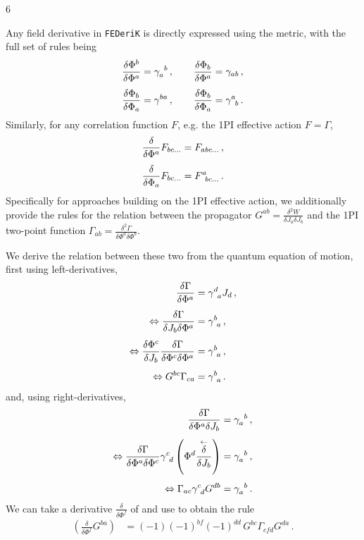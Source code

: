 6\documentclass[10pt,prd,nofootinbib,superscriptaddress,twocolumn]{revtex4-2}
\newcommand{\FEDeriK}{\texttt{FEDeriK}\xspace}
\begin{document}
Any field derivative in \FEDeriK is directly expressed using the metric, with the full set of rules being
%
\begin{align}
	\frac{\delta \Phi^b}{\delta \Phi^a} &= \gamma_a^{\phantom{a}b}
	\,,\qquad
	\frac{\delta \Phi_b}{\delta \Phi^a} = \gamma_{ab}
	\,,\notag\\[1ex]
	\frac{\delta \Phi_b}{\delta \Phi_a} &= \gamma^{ba}
	\,,\qquad
	\frac{\delta \Phi_b}{\delta \Phi_a} = \gamma^{a}_{\phantom{a}b}
	\,.
\end{align}
%
Similarly, for any correlation function $F$, e.g. the 1PI effective action $F=\Gamma$, 
%
\begin{align}
	\frac{\delta }{\delta \Phi^a} F_{bc\ldots} = F_{abc\ldots}
	\,,\notag\\[1ex]
	\frac{\delta }{\delta \Phi_a} F_{bc\ldots} = F^{a}_{\phantom{a}bc\ldots}
	\,.
\end{align}
%
Specifically for approaches building on the 1PI effective action, we additionally provide the rules for the relation between the propagator $G^{ab} = \frac{\delta^2 W}{\delta J_a \delta J_b}$ and the 1PI two-point function $\Gamma_{ab} = \frac{\delta^2 \Gamma}{\delta \Phi^a \delta \Phi^b}$. 

We derive the relation between these two from the quantum equation of motion, first using left-derivatives,
%
\begin{align}\label{eq:propInvLeft}
	\frac{\delta \Gamma}{\delta \Phi^a} &= \gamma^d_{\phantom{d}a}J_d
	\,,\notag\\[1ex]\Leftrightarrow 
	\frac{\delta \Gamma}{\delta J_b\delta \Phi^a} &= \gamma^b_{\phantom{b}a}
	\,,\notag\\[1ex]\Leftrightarrow 
	\frac{\delta \Phi^c}{\delta J_b}\frac{\delta \Gamma}{\delta \Phi^c\delta \Phi^a} &= \gamma^b_{\phantom{b}a}
	\,,\notag\\[1ex]\Leftrightarrow 
	G^{bc}\Gamma_{ca} &= \gamma^b_{\phantom{b}a}
	\,.
\end{align}
%
and, using right-derivatives,
%
\begin{align}\label{eq:propInvRight}
	\frac{\delta \Gamma}{\delta \Phi^a\delta J_b} &= \gamma_a^{\phantom{a}b}
	\,,\notag\\[1ex]\Leftrightarrow 
	\frac{\delta \Gamma}{\delta \Phi^a\delta \Phi^c}\gamma^c_{\phantom{c}d}\left(\Phi^d\frac{\overset{\leftarrow}{\delta}}{\delta J_b}\right) &= \gamma_a^{\phantom{a}b}
	\,,\notag\\[1ex]\Leftrightarrow 
	\Gamma_{ac}\gamma^c_{\phantom{c}d}G^{db} &= \gamma_a^{\phantom{a}b}
	\,.
\end{align}
%
We can take a derivative $\frac{\delta}{\delta\Phi^f}$ of  and use  to obtain the rule
%
\begin{align}
	\left(\frac{\delta}{\delta \Phi^f}G^{ba}\right) 
	&= (-1)(-1)^{bf}(-1)^{dd}\, G^{bc}\Gamma_{cfd}G^{da}\,.
\end{align}
%
\end{document}
